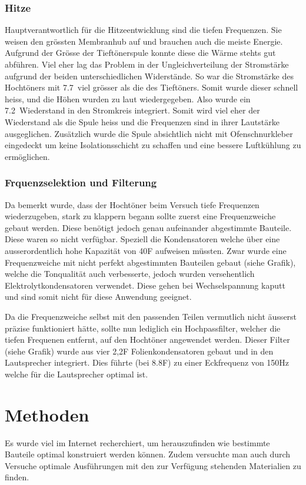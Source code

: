 \documentclass[a4paper,11pt]{report}
\begin{document}
\subsubsection*{Hitze}
Hauptverantwortlich für die Hitzeentwicklung sind die tiefen Frequenzen. Sie weisen den grössten Membranhub auf und brauchen auch die meiste Energie. Aufgrund der Grösse der Tieftönerspule konnte diese die Wärme stehts gut abführen. Viel eher lag das Problem in der Ungleichverteilung der Stromstärke aufgrund der beiden unterschiedlichen Widerstände. So war die Stromstärke des Hochtöners mit 7.7\Omega\ viel grösser als die des Tieftöners. Somit wurde dieser schnell heiss, und die Höhen wurden zu laut wiedergegeben. Also wurde ein 7.2\Omega\ Wiederstand in den Stromkreis integriert. Somit wird viel eher der Wiederstand als die Spule heiss und die Frequenzen sind in ihrer Lautstärke ausgeglichen. Zusätzlich wurde die Spule absichtlich nicht mit Ofenschnurkleber eingedeckt um keine Isolationsschicht zu schaffen und eine bessere Luftkühlung zu ermöglichen.
\subsubsection*{Frquenzselektion und Filterung}
Da bemerkt wurde, dass der Hochtöner beim Versuch tiefe Frequenzen wiederzugeben, stark zu klappern begann sollte zuerst eine Frequenzweiche gebaut werden. Diese benötigt jedoch genau aufeinander abgestimmte Bauteile. Diese waren so nicht verfügbar. Speziell die Kondensatoren welche über eine ausserordentlich hohe Kapazität von 40\mu F aufweisen müssten. Zwar wurde eine Frequenzweiche mit nicht perfekt abgestimmten Bauteilen gebaut (siehe Grafik), welche die Tonqualität auch verbesserte, jedoch wurden versehentlich Elektrolytkondensatoren verwendet. Diese gehen bei Wechselspannung kaputt und sind somit nicht für diese Anwendung geeignet. 

Da die Frequenzweiche selbst mit den passenden Teilen vermutlich nicht äusserst präzise funktioniert hätte, sollte nun lediglich ein Hochpassfilter, welcher die tiefen Frequenen entfernt, auf den Hochtöner angewendet werden. Dieser Filter (siehe Grafik) wurde aus vier 2,2\mu F Folienkondensatoren gebaut und in den Lautsprecher integriert. Dies führte (bei 8.8\mu F) zu einer Eckfrequenz von 150Hz welche für die Lautsprecher optimal ist. 


\section{Methoden}
Es wurde viel im Internet recherchiert, um herauszufinden wie bestimmte Bauteile optimal konstruiert werden können. Zudem versuchte man auch durch Versuche optimale Ausführungen mit den zur Verfügung stehenden Materialien zu finden.
\end{document}
